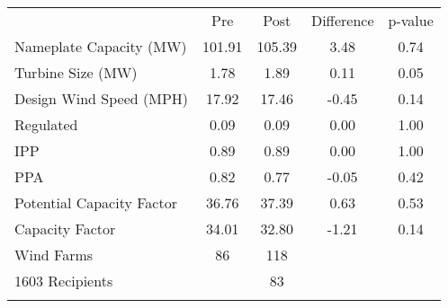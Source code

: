 \begin{center}
\begin{tabular}{lcccc}
\hline \noalign{\smallskip} & Pre & Post & Difference & p-value\\
\noalign{\smallskip}\hline Nameplate Capacity (MW) & 101.91 & 105.39 & 3.48 & 0.74\\
Turbine Size (MW) & 1.78 & 1.89 & 0.11 & 0.05\\
Design Wind Speed (MPH) & 17.92 & 17.46 & -0.45 & 0.14\\
Regulated & 0.09 & 0.09 & 0.00 & 1.00\\
IPP & 0.89 & 0.89 & 0.00 & 1.00\\
PPA & 0.82 & 0.77 & -0.05 & 0.42\\
Potential Capacity Factor & 36.76 & 37.39 & 0.63 & 0.53\\
Capacity Factor & 34.01 & 32.80 & -1.21 & 0.14\\
\hline \noalign{\smallskip}Wind Farms & 86 & 118 &  & \\
1603 Recipients &  & 83 &  & \\
\noalign{\smallskip}\hline\end{tabular}\\
\end{center}
